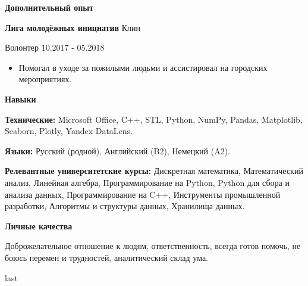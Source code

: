 \documentclass[12pt]{article}
\begin{document}
\begin{center}
    \textbf{Дополнительный опыт}
\end{center}

\textbf{Лига молодёжных инициатив} \hfill Клин

Волонтер \hfill 10.2017 - 05.2018

\vspace{1pt}
\begin{itemize}[noitemsep, topsep=0pt, partopsep=0pt, parsep=0pt]

    \item Помогал в уходе за пожилыми людьми и ассистировал на городских мероприятиях.
    
\end{itemize}

\vspace{12pt}

\begin{center}
    \textbf{Навыки}
\end{center}

\textbf{Технические:} Microsoft Office, C++, STL, Python, NumPy, Pandas, Matplotlib, Seaborn, Plotly, Yandex DataLens.

\textbf{Языки:} Русский (родной), Английский (B2), Немецкий (A2).

\textbf{Релевантные университетские курсы:} Дискретная математика, Математический анализ, Линейная алгебра, Программирование на Python, Python для сбора и анализа данных, Программирование на C++, Инструменты промышленной разработки, Алгоритмы и структуры данных, Хранилища данных.

\vspace{12pt}

\begin{center}
    \textbf{Личные качества}
\end{center}

Доброжелательное отношение к людям, ответственность, всегда готов помочь, не боюсь перемен и трудностей, аналитический склад ума.

last
\end{document}
